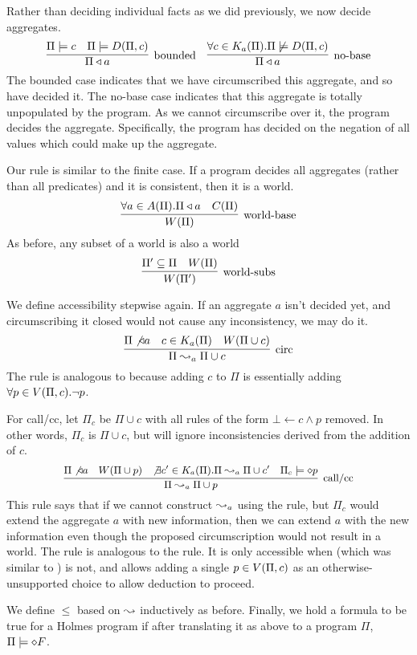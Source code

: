 Rather than deciding individual facts as we did previously, we now decide aggregates.
\[
	\infer[\textrm{bounded}]{\Pi \decides a}{\Pi \models c & \Pi \models \decirc{\Pi}{c}}
	\quad
	\infer[\textrm{no-base}]{\Pi \decides a}{\forall c \in \circset_a(\Pi). \Pi \not \models \decirc{\Pi}{c}}
\]
The bounded case indicates that we have circumscribed this aggregate, and so have decided it.
The no-base case indicates that this aggregate is totally unpopulated by the program.
As we cannot circumscribe over it, the program decides the aggregate.
Specifically, the program has decided on the negation of all values which could make up the aggregate.

Our  rule is similar to the finite case.
If a program decides all aggregates (rather than all predicates) and it is consistent, then it is a world.
\[
	\infer[\textrm{world-base}]{\world{\Pi}}{\forall a \in \aggset(\Pi). \Pi \decides a & C(\Pi)}
\]
As before, any subset of a world is also a world
\[
	\infer[\textrm{world-subs}]{\world{\Pi'}}{\Pi' \subseteq \Pi & \world{\Pi}}
\]

We define accessibility stepwise again.
If an aggregate $a$ isn't decided yet, and circumscribing it closed would not cause any inconsistency, we may do it.
\[
	\infer[\textrm{circ}]{\Pi \stepass_a \Pi \cup c}{\Pi \not \decides a & c \in \circset_a(\Pi) & W(\Pi \cup c)}
\]
The  rule is analogous to  because adding $c$ to $\Pi$ is essentially adding $\forall p \in V(\Pi, c). \neg p$.

For call/cc, let $\Pi_c$ be $\Pi \cup c$ with all rules of the form $\bot \leftarrow c \wedge p$ removed.
In other words, $\Pi_c$ is $\Pi \cup c$, but will ignore inconsistencies derived from the addition of $c$.
\[\small
	\infer[\textrm{call/cc}]{\Pi \stepass_a \Pi \cup p}{\Pi \not \decides a & \world{\Pi \cup p} & \not \exists c' \in \circset_a(\Pi). \Pi \stepass_a \Pi \cup c' & \Pi_c \models \dia p}
\]
This rule says that if we cannot construct $\leadsto_a$ using the  rule, but $\Pi_c$ would extend the aggregate $a$ with new information, then we can extend $a$ with the new information even though the proposed circumscription would not result in a world.
The  rule is analogous to the  rule.
It is only accessible when  (which was similar to ) is not, and allows adding a single $p \in V(\Pi, c)$ as an otherwise-unsupported choice to allow deduction to proceed.

We define $\leq$ based on $\leadsto$ inductively as before.
Finally, we hold a formula to be true for a Holmes program if after translating it as above to a program $\Pi$, $\Pi \models \diamond F$.

